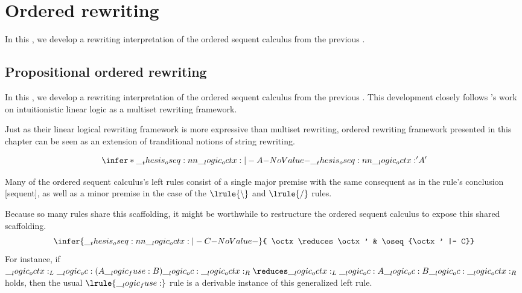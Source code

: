 \chapter{Ordered rewriting}\label{ch:ordered-rewriting}

In this , we develop a rewriting interpretation of the ordered sequent calculus from the previous .

\section{Propositional ordered rewriting}

In this , we develop a rewriting interpretation of the ordered sequent calculus from the previous .
This development closely follows \citeauthor{Cervesato+Scedrov:IC09}'s work on intuitionistic linear logic as a multiset rewriting framework.

Just as their linear logical rewriting framework is more expressive than multiset rewriting, ordered rewriting framework presented in this chapter can be seen as an extension of tranditional notions of string rewriting.


\begin{equation*}
  \infer*{\oseq{\octx |- A}}{
    \oseq{\octx' |- A'}}
\end{equation*}


Many of the ordered sequent calculus's left rules consist of a single major premise with the same consequent as in the rule's conclusion [sequent], as well as a minor premise in the case of the $\lrule{\limp}$ and $\lrule{\pmir}$ rules.

Because so many rules share this scaffolding, it might be worthwhile to restructure the ordered sequent calculus to expose this shared scaffolding.
\begin{equation*}
  \infer{\oseq{\octx |- C}}{
    \octx \reduces \octx' & \oseq{\octx' |- C}}
\end{equation*}
For instance, if $\octx_L \oc (A \fuse B) \oc \octx_R \reduces \octx_L \oc A \oc B \oc \octx_R$ holds, then the usual $\lrule{\fuse}$ rule is a derivable instance of this generalized left rule.



